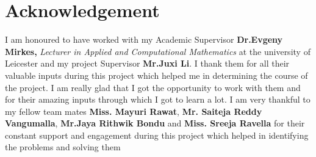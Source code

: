 \chapter*{Acknowledgement}

\hspace{10mm}I am honoured to have worked with my Academic Supervisor \textbf{Dr.Evgeny Mirkes,}\textit{ Lecturer in 
Applied and Computational Mathematics} at the university of Leicester and my project Supervisor \textbf{Mr.Juxi Li}. I thank them for all their valuable inputs during this project which helped me in determining the course of the project. I am really glad that I got the opportunity to work with them and for their amazing inputs through which I  got to learn a lot. I am very thankful to my fellow team mates \textbf{Miss. Mayuri Rawat}, \textbf{Mr. Saiteja Reddy Vangumalla},  \textbf{Mr.Jaya Rithwik Bondu }and\textbf{ Miss. Sreeja Ravella} for their constant support and engagement during this project which helped in identifying the problems and solving them
